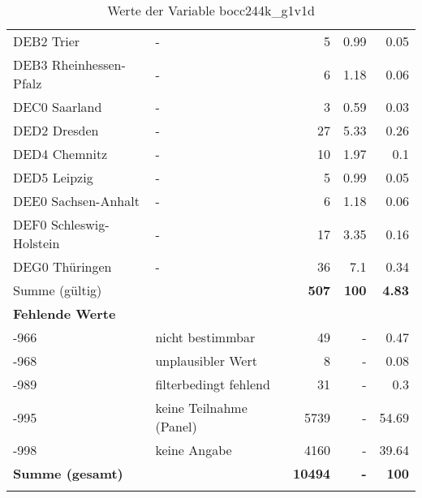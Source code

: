 \begin{longtable}{Xlrrr}
        \multicolumn{1}{X}{DEB2 Trier} & - & \num{5} & \num[round-mode=places,round-precision=2]{0.99} & \num[round-mode=places,round-precision=2]{0.05} \\
        \multicolumn{1}{X}{DEB3 Rheinhessen-Pfalz} & - & \num{6} & \num[round-mode=places,round-precision=2]{1.18} & \num[round-mode=places,round-precision=2]{0.06} \\
        \multicolumn{1}{X}{DEC0 Saarland} & - & \num{3} & \num[round-mode=places,round-precision=2]{0.59} & \num[round-mode=places,round-precision=2]{0.03} \\
        \multicolumn{1}{X}{DED2 Dresden} & - & \num{27} & \num[round-mode=places,round-precision=2]{5.33} & \num[round-mode=places,round-precision=2]{0.26} \\
        \multicolumn{1}{X}{DED4 Chemnitz} & - & \num{10} & \num[round-mode=places,round-precision=2]{1.97} & \num[round-mode=places,round-precision=2]{0.1} \\
        \multicolumn{1}{X}{DED5 Leipzig} & - & \num{5} & \num[round-mode=places,round-precision=2]{0.99} & \num[round-mode=places,round-precision=2]{0.05} \\
        \multicolumn{1}{X}{DEE0 Sachsen-Anhalt} & - & \num{6} & \num[round-mode=places,round-precision=2]{1.18} & \num[round-mode=places,round-precision=2]{0.06} \\
        \multicolumn{1}{X}{DEF0 Schleswig-Holstein} & - & \num{17} & \num[round-mode=places,round-precision=2]{3.35} & \num[round-mode=places,round-precision=2]{0.16} \\
        \multicolumn{1}{X}{DEG0 Thüringen} & - & \num{36} & \num[round-mode=places,round-precision=2]{7.1} & \num[round-mode=places,round-precision=2]{0.34} \\
     \midrule
      \multicolumn{2}{l}{Summe (gültig)} & \textbf{\num{507}} &
      \textbf{\num{100}} &
         \textbf{\num[round-mode=places,round-precision=2]{4.83}} \\
     \multicolumn{5}{l}{\textbf{Fehlende Werte}}\\
       -966 & nicht bestimmbar & \num{49} & - & \num[round-mode=places,round-precision=2]{0.47} \\

       -968 & unplausibler Wert & \num{8} & - & \num[round-mode=places,round-precision=2]{0.08} \\

       -989 & filterbedingt fehlend & \num{31} & - & \num[round-mode=places,round-precision=2]{0.3} \\

       -995 & keine Teilnahme (Panel) & \num{5739} & - & \num[round-mode=places,round-precision=2]{54.69} \\

       -998 & keine Angabe & \num{4160} & - & \num[round-mode=places,round-precision=2]{39.64} \\

     \midrule
     \multicolumn{2}{l}{\textbf{Summe (gesamt)}} & \textbf{\num{10494}} & \textbf{-} & \textbf{\num{100}} \\
     \bottomrule
     \caption{Werte der Variable bocc244k\_g1v1d}
     \end{longtable}
     
